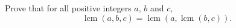 Prove that for all positive integers $a$, $b$ and $c$,
\[\operatorname{lcm}(a,b,c)=\operatorname{lcm}\left(a,\operatorname{lcm}(b,c)\right).\]
